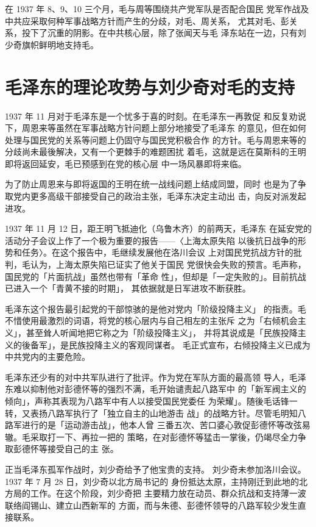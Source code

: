 在 1937 年 8、9、10 三个月，毛与周等围绕共产党军队是否配合国民
党军作战及中共应采取何种军事战略方针而产生的分歧，对毛、周关系，
尤其对毛、彭关系，投下了沉重的阴影。在中共核心层，除了张闻天与毛
泽东站在一边，只有刘少奇旗帜鲜明地支持毛。
\section{ 毛泽东的理论攻势与刘少奇对毛的支持}
1937 年 11 月对于毛泽东是一个忧多于喜的时刻。在毛泽东一再敦促
和反复劝说下，周恩来等虽然在军事战略方针问题上部分地接受了毛泽东
的意见，但在如何处理与国民党的关系等问题上仍固守与国民党积极合作
的方针。毛与周恩来等的分歧尚未最後解决，又有一个更棘手的难题困扰
着毛，这就是远在莫斯科的王明即将返回延安，毛已预感到在党的核心层
中一场风暴即将来临。

为了防止周恩来与即将返国的王明在统一战线问题上结成同盟，同时
也是为了争取党内更多高级干部接受自己的政治主张，毛泽东决定主动出
击，向反对派发起进攻。

1937 年 11 月 12 日，距王明飞抵迪化（乌鲁木齐）的前两天，毛泽东
在延安党的活动分子会议上作了一个极为重要的报告——〈上海太原失陷
以後抗日战争的形势和任务〉。在这个报告中，毛继续发展他在洛川会议
上对国民党抗战方针的批判，毛认为，上海太原失陷已证实了他关于国民
党很快会失败的预言。毛声称，国民党的「片面抗战」虽然也带有「革命
性」，但却是「一定失败的」。目前抗战已进入一个「青黄不接的时期」，
其依据就是日军进攻不断获胜。

毛泽东这个报告最引起党的干部惊骇的是他对党内「阶级投降主义」
的指责。毛不惜使用最激烈的词语，将党的核心层内与自己相左的主张斥
之为「右倾机会主义」，甚至耸人听闻地把它称之为「阶级投降主义」，
并将其说成是「民族投降主义的後备军」，是民族投降主义的客观同谋者。
毛正式宣布，右倾投降主义已成为中共党内的主要危险。

毛泽东还少有的对中共军队进行了批评。作为党在军队方面的最高领
导人，毛泽东难以抑制他对彭德怀等的强烈不满，毛开始谴责起八路军中
的「新军阀主义的倾向」，声称其表现为八路军中有人以接受国民党委任
为荣耀」。随後毛话锋一转，又表扬八路军执行了「独立自主的山地游击
战」的战略方针。尽管毛明知八路军进行的是「运动游击战」，他本人曾
三番五次、苦口婆心敦促彭德怀等改弦易辙。毛采取打一下、再拉一把的
策略，在对彭德怀等猛击一掌後，仍竭尽全力争取彭德怀等接受自己的主
张。

正当毛泽东孤军作战时，刘少奇给予了他宝贵的支持。
刘少奇未参加洛川会议。1937 年 7 月 28 日，刘少奇以北方局书记的
身份抵达太原，主持刚迁到此地的北方局的工作。在这个阶段，刘少奇把
主要精力放在动员、群众抗战和支持薄一波联络阎锡山、建立山西新军的
方面，而与朱德、彭德怀领导的八路军较少发生直接联系。

